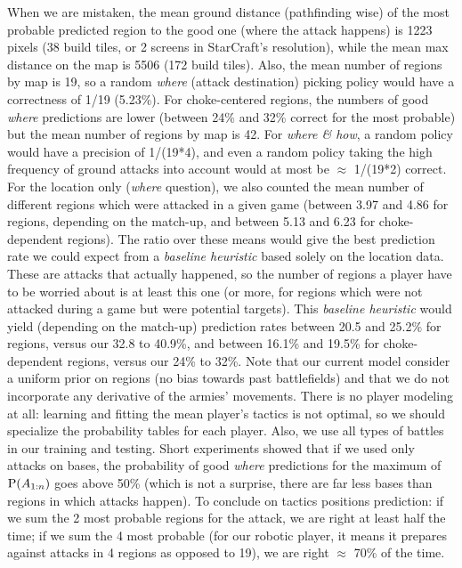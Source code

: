 When we are mistaken, the mean ground distance (pathfinding wise) of the most probable predicted region to the good one (where the attack happens) is 1223 pixels (38 build tiles, or 2 screens in StarCraft's resolution), while the mean max distance on the map is 5506 (172 build tiles). Also, the mean number of regions by map is 19, so a random \textit{where} (attack destination) picking policy would have a correctness of 1/19 (5.23\%). For choke-centered regions, the numbers of good \textit{where} predictions are lower (between 24\% and 32\% correct for the most probable) but the mean number of regions by map is 42. For \textit{where \& how}, a random policy would have a precision of 1/(19*4), and even a random policy taking the high frequency of ground attacks into account would at most be $\approx$ 1/(19*2) correct. 
For the location only (\textit{where} question), we also counted the mean number of different regions which were attacked in a given game (between 3.97 and 4.86 for regions, depending on the match-up, and between 5.13 and 6.23 for choke-dependent regions). The ratio over these means would give the best prediction rate we could expect from a \textit{baseline heuristic} based solely on the location data. These are attacks that actually happened, so the number of regions a player have to be worried about is at least this one (or more, for regions which were not attacked during a game but were potential targets). This \textit{baseline heuristic} would yield (depending on the match-up) prediction rates between 20.5 and 25.2\% for regions, versus our 32.8 to 40.9\%, and between 16.1\% and 19.5\% for choke-dependent regions, versus our 24\% to 32\%.
Note that our current model consider a uniform prior on regions (no bias towards past battlefields) and that we do not incorporate any derivative of the armies' movements. There is no player modeling at all: learning and fitting the mean player's tactics is not optimal, so we should specialize the probability tables for each player. Also, we use all types of battles in our training and testing. Short experiments showed that if we used only attacks on bases, the probability of good \textit{where} predictions for the maximum of $\mathrm{P}(A_{1:n})$ goes above 50\% (which is not a surprise, there are far less bases than regions in which attacks happen). To conclude on tactics positions prediction: if we sum the 2 most probable regions for the attack, we are right at least half the time; if we sum the 4 most probable (for our robotic player, it means it prepares against attacks in 4 regions as opposed to 19), we are right $\approx$ 70\% of the time.

